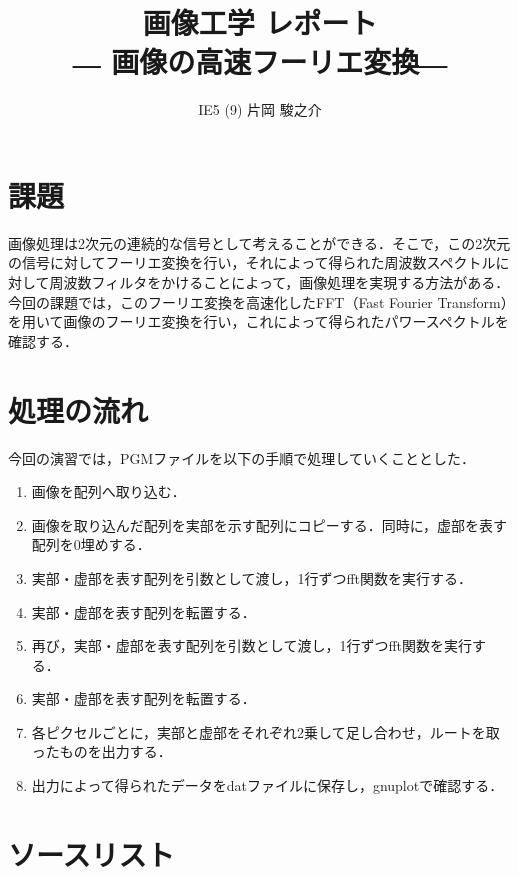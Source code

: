 \documentclass{jsarticle}
\begin{document}
\title{画像工学 レポート\\ \vspace{1cm}― 画像の高速フーリエ変換―\vspace{2cm}}
\author{IE5 (9) 片岡 駿之介 \vspace{1cm}}
\maketitle

\newpage

\section{課題}

画像処理は2次元の連続的な信号として考えることができる．そこで，この2次元の信号に対してフーリエ変換を行い，それによって得られた周波数スペクトルに対して周波数フィルタをかけることによって，画像処理を実現する方法がある．\\
今回の課題では，このフーリエ変換を高速化したFFT（Fast Fourier Transform）を用いて画像のフーリエ変換を行い，これによって得られたパワースペクトルを確認する．

\section{処理の流れ}

今回の演習では，PGMファイルを以下の手順で処理していくこととした．
\begin{enumerate}
  \item 画像を配列へ取り込む．
  \item 画像を取り込んだ配列を実部を示す配列にコピーする．同時に，虚部を表す配列を0埋めする．
  \item 実部・虚部を表す配列を引数として渡し，1行ずつfft関数を実行する．
  \item 実部・虚部を表す配列を転置する．
  \item 再び，実部・虚部を表す配列を引数として渡し，1行ずつfft関数を実行する．
  \item 実部・虚部を表す配列を転置する．
  \item 各ピクセルごとに，実部と虚部をそれぞれ2乗して足し合わせ，ルートを取ったものを出力する．
  \item 出力によって得られたデータをdatファイルに保存し，gnuplotで確認する．
\end{enumerate}

\newpage

\section{ソースリスト}
\end{document}
